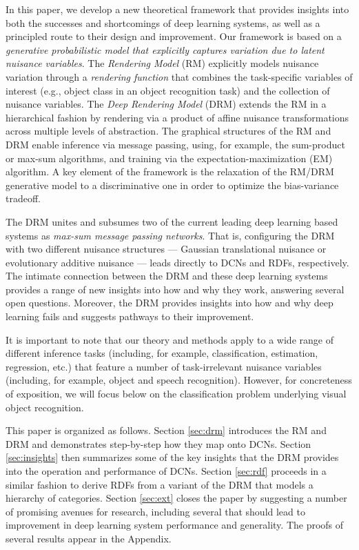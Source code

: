 \documentclass[12pt]{article}
\begin{document}
In this paper, we develop a new theoretical framework that provides insights into both the successes and shortcomings of deep learning systems, as well as a principled route to their design and improvement.
Our framework is based on a {\em generative probabilistic model that explicitly captures variation due to latent nuisance variables}.  
The {\em Rendering Model} (RM) explicitly models nuisance variation through a {\em rendering function} that combines the task-specific variables of interest (e.g., object class in an object recognition task) and the collection of nuisance variables.  
The {\em Deep Rendering Model} (DRM) extends the RM in a hierarchical fashion by rendering via a product of affine nuisance transformations across multiple levels of abstraction.  
The graphical structures of the RM and DRM enable inference via message passing, using, for example, the sum-product or max-sum algorithms, and training via the expectation-maximization (EM) algorithm.
A key element of the framework is the relaxation of the RM/DRM generative model to a discriminative one in order to optimize the bias-variance tradeoff.

The DRM unites and subsumes two of the current leading deep learning based systems as {\em max-sum message passing networks}.   
That is, configuring the DRM with two different nuisance structures --- Gaussian translational nuisance or 
evolutionary additive nuisance --- leads directly to DCNs and RDFs, respectively.
The intimate connection between the DRM and these deep learning systems provides a range of new insights into how and why they work, answering several open questions.  
Moreover, the DRM provides insights into how and why deep learning fails and suggests pathways to their improvement.

It is important to note that our theory and methods apply to a wide range of different inference tasks (including, for example, classification, estimation, regression, etc.) 
that feature a number of task-irrelevant nuisance variables
(including, for example, object and speech recognition). 
However, for concreteness of exposition, we will focus below on the classification problem underlying visual object recognition. 

This paper is organized as follows.  
Section \ref{sec:drm} introduces the RM and DRM and demonstrates step-by-step how they map onto DCNs.
Section \ref{sec:insights} then summarizes some of the key insights that the DRM provides into the operation and performance of DCNs.
Section \ref{sec:rdf} 
proceeds in a similar fashion to derive RDFs from a variant of the DRM that models a hierarchy of categories.
Section \ref{sec:ext} closes the paper by suggesting a number of promising avenues for research, including several that should lead to improvement in deep learning system performance and generality.  
The proofs of several results appear in the Appendix.
\end{document}
